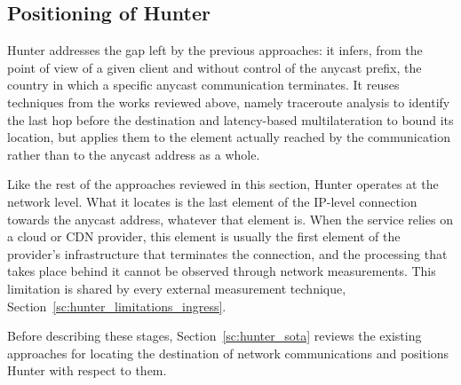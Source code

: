 \documentclass[
A4paper,                %
twoside,                %
openright,              %
chapterprefix=true,     %
12pt,                   %
headings=normal,        %
titlepage=on            %
]{book}
\begin{document}
\subsection{Positioning of Hunter}
\label{sc:hunter_sota_positioning}

Hunter addresses the gap left by the previous approaches: it infers, from the point of view of a given client and without control of the anycast prefix, the country in which a specific anycast communication terminates. It reuses techniques from the works reviewed above, namely traceroute analysis to identify the last hop before the destination and latency-based multilateration to bound its location, but applies them to the element actually reached by the communication rather than to the anycast address as a whole.

Like the rest of the approaches reviewed in this section, Hunter operates at the network level. What it locates is the last element of the IP-level connection towards the anycast address, whatever that element is. When the service relies on a cloud or CDN provider, this element is usually the first element of the provider's infrastructure that terminates the connection, and the processing that takes place behind it cannot be observed through network measurements. This limitation is shared by every external measurement technique, Section~\ref{sc:hunter_limitations_ingress}.

Before describing these stages, Section~\ref{sc:hunter_sota} reviews the existing approaches for locating the destination of network communications and positions Hunter with respect to them.
\end{document}
